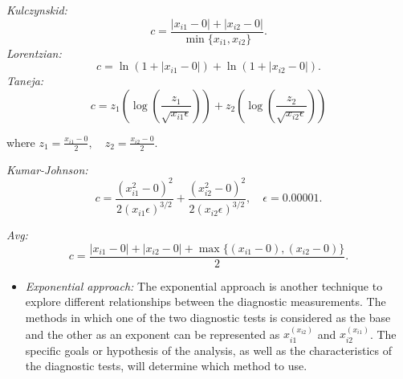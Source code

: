 \emph{Kulczynskid:}
\begin{equation}
c = \frac{|x_{i1} - 0| + |x_{i2} - 0|}{\min\{x_{i1}, x_{i2}\}}.
  \label{eq:canberraLikeComb}
\end{equation}
\emph{Lorentzian:}
\begin{equation}
c = \ln(1 + |x_{i1} - 0|) + \ln(1 + |x_{i2} - 0|).
  \label{eq:logDistComb}
\end{equation}
\emph{Taneja:}
\begin{equation}
c = z_1 \left( \log \left( \frac{z_1}{\sqrt{x_{i1} \epsilon}} \right) \right) + z_2 \left( \log \left( \frac{z_2}{\sqrt{x_{i2} \epsilon}} \right) \right)
  \label{eq:entropyComb}
\end{equation}

where \(z_1 = \frac{x_{i1} - 0}{2}, \quad z_2 = \frac{x_{i2} - 0}{2}\).

\emph{Kumar-Johnson:}
\begin{equation}
c = \frac{(x_{i1}^2 - 0)^2}{2(x_{i1} \epsilon)^{3/2}} + \frac{(x_{i2}^2 - 0)^2}{2(x_{i2} \epsilon)^{3/2}}, \quad \epsilon = 0.00001.
  \label{eq:complexPowerComb}
\end{equation}

\emph{Avg:}
\begin{equation}
c = \frac{|x_{i1} - 0| + |x_{i2} - 0| + \max\{(x_{i1} - 0), (x_{i2} - 0)\}}{2}.
  \label{eq:hybridDistComb}
\end{equation}

\begin{itemize}
\tightlist
\item
  \emph{Exponential approach:}
  The exponential approach is another technique to explore different relationships between the diagnostic measurements. The methods in which one of the two diagnostic tests is considered as the base and the other as an exponent can be represented as \(x_{i1}^{\left(x_{i2}\right)}\) and \(x_{i2}^{\left(x_{i1}\right)}\). The specific goals or hypothesis of the analysis, as well as the characteristics of the diagnostic tests, will determine which method to use.
\end{itemize}


